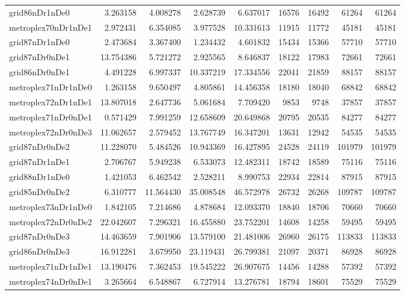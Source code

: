 \begin{longtable}{|l|r|r|r|r|r|r|r|r|}
grid86nDr1nDe0 & 3.263158 & 4.008278 & 2.628739 & 6.637017 & 16576 & 16492 & 61264 & 61264 \\
metroplex70nDr1nDe1 & 2.972431 & 6.354085 & 3.977528 & 10.331613 & 11915 & 11772 & 45181 & 45181 \\
grid87nDr1nDe0 & 2.473684 & 3.367400 & 1.234432 & 4.601832 & 15434 & 15366 & 57710 & 57710 \\
grid87nDr0nDe1 & 13.754386 & 5.721272 & 2.925565 & 8.646837 & 18122 & 17983 & 72661 & 72661 \\
grid86nDr0nDe1 & 4.491228 & 6.997337 & 10.337219 & 17.334556 & 22041 & 21859 & 88157 & 88157 \\
metroplex71nDr1nDe0 & 1.263158 & 9.650497 & 4.805861 & 14.456358 & 18180 & 18040 & 68842 & 68842 \\
metroplex72nDr1nDe1 & 13.807018 & 2.647736 & 5.061684 & 7.709420 & 9853 & 9748 & 37857 & 37857 \\
metroplex71nDr0nDe1 & 0.571429 & 7.991259 & 12.658609 & 20.649868 & 20795 & 20535 & 84277 & 84277 \\
metroplex72nDr0nDe3 & 11.062657 & 2.579452 & 13.767749 & 16.347201 & 13631 & 12942 & 54535 & 54535 \\
grid87nDr0nDe2 & 11.228070 & 5.484526 & 10.943369 & 16.427895 & 24528 & 24119 & 101979 & 101979 \\
grid87nDr1nDe1 & 2.706767 & 5.949238 & 6.533073 & 12.482311 & 18742 & 18589 & 75116 & 75116 \\
grid88nDr1nDe0 & 1.421053 & 6.462542 & 2.528211 & 8.990753 & 22934 & 22814 & 87915 & 87915 \\
grid85nDr0nDe2 & 6.310777 & 11.564430 & 35.008548 & 46.572978 & 26732 & 26268 & 109787 & 109787 \\
metroplex73nDr1nDe0 & 1.842105 & 7.214686 & 4.878684 & 12.093370 & 18840 & 18706 & 70660 & 70660 \\
metroplex72nDr0nDe2 & 22.042607 & 7.296321 & 16.455880 & 23.752201 & 14608 & 14258 & 59495 & 59495 \\
grid87nDr0nDe3 & 14.463659 & 7.901906 & 13.579100 & 21.481006 & 26960 & 26175 & 113833 & 113833 \\
grid86nDr0nDe3 & 16.912281 & 3.679950 & 23.119431 & 26.799381 & 21097 & 20371 & 86928 & 86928 \\
metroplex71nDr1nDe1 & 13.190476 & 7.362453 & 19.545222 & 26.907675 & 14456 & 14288 & 57392 & 57392 \\
metroplex74nDr0nDe1 & 3.265664 & 6.548867 & 6.727914 & 13.276781 & 18794 & 18601 & 75529 & 75529 \\

\end{longtable}
